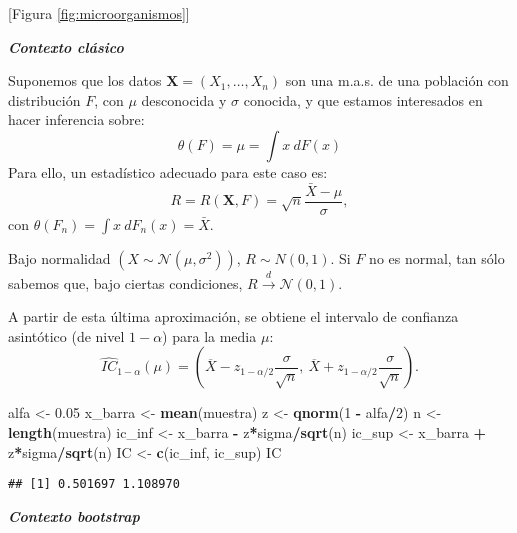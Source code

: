 \documentclass[]{book}
\newenvironment{Shaded}{\begin{snugshade}}{\end{snugshade}}
\newcommand{\KeywordTok}[1]{\textcolor[rgb]{0.13,0.29,0.53}{\textbf{#1}}}
\newcommand{\DecValTok}[1]{\textcolor[rgb]{0.00,0.00,0.81}{#1}}
\newcommand{\FloatTok}[1]{\textcolor[rgb]{0.00,0.00,0.81}{#1}}
\newcommand{\StringTok}[1]{\textcolor[rgb]{0.31,0.60,0.02}{#1}}
\newcommand{\OperatorTok}[1]{\textcolor[rgb]{0.81,0.36,0.00}{\textbf{#1}}}
\newcommand{\NormalTok}[1]{#1}
\theoremstyle{break}
\theoremstyle{definition}
\theoremstyle{definition}
\theoremstyle{definition}
\theoremstyle{remark}
\begin{document}
{[}Figura \ref{fig:microorganismos}{]}

\textbf{\emph{Contexto clásico}}

Suponemos que los datos \(\mathbf{X}=\left( X_1,\ldots ,X_n \right)\)
son una m.a.s. de una población con distribución \(F\), con \(\mu\)
desconocida y \(\sigma\) conocida, y que estamos interesados en hacer
inferencia sobre:
\[\theta \left( F \right) =\mu =\int x~dF\left( x \right)\] Para ello,
un estadístico adecuado para este caso es:
\[R=R\left( \mathbf{X},F \right) =\sqrt{n}\frac{\bar{X}-\mu }{\sigma},\]
con
\(\theta \left( F_n \right) =\int x~dF_n\left( x \right) = \bar{X}\).

Bajo normalidad
\(\left( X\sim \mathcal{N}\left( \mu ,\sigma^2 \right) \right)\),
\(R\sim N\left( 0,1 \right)\). Si \(F\) no es normal, tan sólo sabemos
que, bajo ciertas condiciones,
\(R\overset{d}{\rightarrow }\mathcal{N}\left( 0, 1 \right)\).

A partir de esta última aproximación, se obtiene el intervalo de
confianza asintótico (de nivel \(1-\alpha\)) para la media \(\mu\):
\[\hat{IC}_{1-\alpha}\left(  \mu\right)  = 
\left(  \overline{X}-z_{1-\alpha/2}\dfrac{\sigma}{\sqrt{n}},\ \overline{X} 
+ z_{1-\alpha/2}\dfrac{\sigma}{\sqrt{n}} \right).\]

\begin{Shaded}
\begin{Highlighting}[]
\NormalTok{alfa <-}\StringTok{ }\FloatTok{0.05}
\NormalTok{x_barra <-}\StringTok{ }\KeywordTok{mean}\NormalTok{(muestra)}
\NormalTok{z <-}\StringTok{ }\KeywordTok{qnorm}\NormalTok{(}\DecValTok{1} \OperatorTok{-}\StringTok{ }\NormalTok{alfa}\OperatorTok{/}\DecValTok{2}\NormalTok{)}
\NormalTok{n <-}\StringTok{ }\KeywordTok{length}\NormalTok{(muestra)}
\NormalTok{ic_inf <-}\StringTok{ }\NormalTok{x_barra }\OperatorTok{-}\StringTok{ }\NormalTok{z}\OperatorTok{*}\NormalTok{sigma}\OperatorTok{/}\KeywordTok{sqrt}\NormalTok{(n)}
\NormalTok{ic_sup <-}\StringTok{ }\NormalTok{x_barra }\OperatorTok{+}\StringTok{ }\NormalTok{z}\OperatorTok{*}\NormalTok{sigma}\OperatorTok{/}\KeywordTok{sqrt}\NormalTok{(n)}
\NormalTok{IC <-}\StringTok{ }\KeywordTok{c}\NormalTok{(ic_inf, ic_sup)}
\NormalTok{IC}
\end{Highlighting}
\end{Shaded}

\begin{verbatim}
## [1] 0.501697 1.108970
\end{verbatim}

\textbf{\emph{Contexto bootstrap}}
\end{document}
